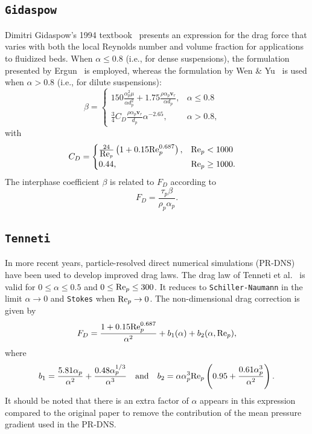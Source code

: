 \documentclass[12pt]{article}
\newcommand{\code}[1]{\texttt{#1}}
\newcommand{\Rep}{\mbox{\rm Re}_p} %
\begin{document}
\begin{appendices}
\subsection{\code{Gidaspow}~\cite{gidaspow1994multiphase}}
Dimitri Gidaspow's 1994 textbook~\cite{gidaspow1994multiphase} presents an expression for the drag force that varies with both the local Reynolds number and volume fraction for applications to fluidized beds. When $\alpha\le0.8$ (i.e., for dense suspensions), the formulation presented by Ergun~\cite{ergun1952fluid} is employed, whereas the formulation by Wen \& Yu~\cite{wen1966mechanics} is used when $\alpha>0.8$ (i.e., for dilute suspensions):
\begin{equation}
\beta=\begin{cases}
    150\frac{\alpha_p^2\mu}{\alpha d_p^2}+1.75\frac{\rho\alpha_p\bm{v}_r}{\alpha d_p}, & \alpha\le 0.8\\
    \frac{3}{4} C_D \frac{\rho\alpha_p\bm{v}_r}{d_p}\alpha^{-2.65}, & \alpha > 0.8,
  \end{cases} \quad
\end{equation}
with
\begin{equation}
C_D=\begin{cases}
    \frac{24}{\Rep}\left(1+0.15\Rep^{0.687}\right), & \Rep<1000\\
    0.44, & \Rep\ge1000.
  \end{cases} \quad
\end{equation}
The interphase coefficient $\beta$ is related to $F_D$ according to
\begin{equation}
F_D=\frac{\tau_p\beta}{\rho_p\alpha_p}.
\end{equation}

\subsection{\code{Tenneti}~\cite{tenneti2011drag}}
In more recent years, particle-resolved direct numerical simulations (PR-DNS) have been used to develop improved drag laws. The drag law of Tenneti et al.~\cite{tenneti2011drag} is valid for $0\le\alpha\le0.5$ and $0\le\Rep\le300$. It reduces to \code{Schiller-Naumann} in the limit $\alpha\rightarrow0$ and \code{Stokes} when $\Rep\rightarrow0$. The non-dimensional drag correction is given by
\begin{equation}
F_D=\frac{1+0.15\Rep^{0.687}}{\alpha^2}+b_1(\alpha)+b_2(\alpha,\Rep),
\end{equation}
where
\begin{equation}
b_1=\frac{5.81\alpha_p}{\alpha^2}+\frac{0.48\alpha_p^{1/3}}{\alpha^3}\quad\text{and}\quad b_2=\alpha\alpha_p^3\Rep\left(0.95+\frac{0.61\alpha_p^3}{\alpha^2}\right).
\end{equation}
It should be noted that there is an extra factor of $\alpha$ appears in this expression compared to the original paper to remove the contribution of the mean pressure gradient used in the PR-DNS.
\end{appendices}

\newpage


\end{document}
